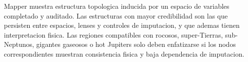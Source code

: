 Mapper muestra estructura topologica inducida por un espacio de variables completado y auditado. Las estructuras con mayor credibilidad son las que persisten entre espacios, lenses y controles de imputacion, y que ademas tienen interpretacion fisica. Las regiones compatibles con rocosos, super-Tierras, sub-Neptunos, gigantes gaseosos o hot Jupiters solo deben enfatizarse si los nodos correspondientes muestran consistencia fisica y baja dependencia de imputacion.
